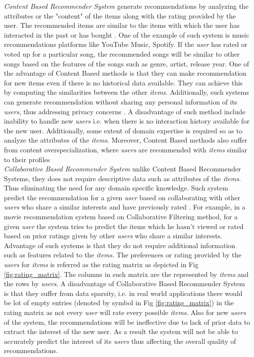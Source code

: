 \emph{Content Based Recommender System} generate recommendations by analyzing the attributes or the "content" of the items along with the rating provided by the user. The recommended items are similar to the items with which the user has interacted in the past or has bought \autocite[15]{Mertens1997}. One of the example of such system is music recommendations platforms like YouTube Music, Spotify. If the \emph{user} has rated or voted up for a particular song, the recommended songs will be similar to other songs based on the features of the songs such as genre, artist, release year. One of the advantage of Content Based methods is that they can make recommendation for new items even if there is no historical data available. They can achieve this by computing the similarities between the other \emph{items}. Additionally, such systems can generate recommendation without sharing any personal information of its \emph{users}, thus addressing privacy concerns \autocite[15]{Lam2006}. A disadvantage of such method include inability to handle new \emph{users} i.e. when there is no interaction history available for the new user. Additionally, some extent of domain expertise is required so as to analyze the attributes of the \emph{items}. Moreover, Content Based methods also suffer from content overspecialization, where \emph{users} are recommended with \emph{items} similar to their profiles \autocite[314]{zhang2002recommender} \\

\emph{Collaborative Based Recommender System} unlike Content Based Recommender Systems, they does not require descriptive data such as attributes of the \emph{items}. Thus eliminating the need for any domain specific knowledge. Such system predict the recommendation for a given \emph{user} based on collaborating with other \emph{users} who share a similar interests and have previously rated \autocite[737]{Adomavicius2005}. For example, in a movie recommendation system based on Collaborative Filtering method, for a given \emph{user} the system tries to predict the items which he hasn't viewed or rated based on prior ratings given by other \emph{users} who share a similar interests. Advantage of such systems is that they do not require additional information such as features related to the \emph{items}. The preferences or rating provided by the \emph{users} for \emph{items} is referred as the rating matrix as depicted in Fig \ref{fig:rating_matrix}. The columns in such matrix are the represented by \emph{items} and the rows by \emph{users}. A disadvantage of Collaborative Based Recommender System is that they suffer from data sparsity, i.e. in real world applications there would be lot of empty entries (denoted by \varphi   symbol in Fig \ref{fig:rating_matrix}) in the rating matrix as not every \emph{user} will rate every possible \emph{items}\autocite[1]{Koren2015}. Also for new \emph{users} of the system, the recommendations will be ineffective due to lack of prior data to extract the interest of the new user. As a result the system will not be able to accurately predict the interest of its \emph{users} thus affecting the overall quality of recommendations.

